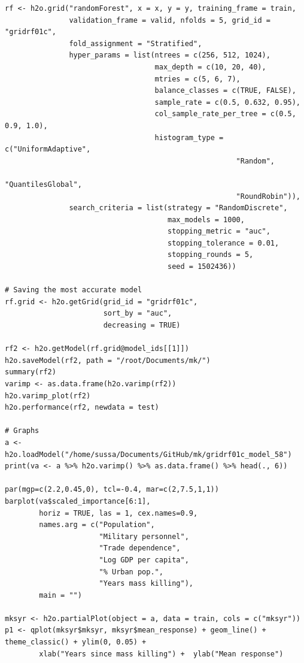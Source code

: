 \documentclass[a4paper,12pt]{article}
\begin{document}
\begin{verbatim}
rf <- h2o.grid("randomForest", x = x, y = y, training_frame = train, 
               validation_frame = valid, nfolds = 5, grid_id = "gridrf01c",
               fold_assignment = "Stratified",
               hyper_params = list(ntrees = c(256, 512, 1024),
                                   max_depth = c(10, 20, 40),
                                   mtries = c(5, 6, 7),
                                   balance_classes = c(TRUE, FALSE),
                                   sample_rate = c(0.5, 0.632, 0.95),
                                   col_sample_rate_per_tree = c(0.5, 0.9, 1.0),
                                   histogram_type = c("UniformAdaptive",
                                                      "Random",
                                                      "QuantilesGlobal",
                                                      "RoundRobin")),
               search_criteria = list(strategy = "RandomDiscrete", 
                                      max_models = 1000, 
                                      stopping_metric = "auc", 
                                      stopping_tolerance = 0.01, 
                                      stopping_rounds = 5, 
                                      seed = 1502436)) 

# Saving the most accurate model
rf.grid <- h2o.getGrid(grid_id = "gridrf01c",
                       sort_by = "auc",
                       decreasing = TRUE)

rf2 <- h2o.getModel(rf.grid@model_ids[[1]])
h2o.saveModel(rf2, path = "/root/Documents/mk/")
summary(rf2)
varimp <- as.data.frame(h2o.varimp(rf2))
h2o.varimp_plot(rf2)
h2o.performance(rf2, newdata = test)

# Graphs
a <- h2o.loadModel("/home/sussa/Documents/GitHub/mk/gridrf01c_model_58")
print(va <- a %>% h2o.varimp() %>% as.data.frame() %>% head(., 6)) 

par(mgp=c(2.2,0.45,0), tcl=-0.4, mar=c(2,7.5,1,1))
barplot(va$scaled_importance[6:1],
        horiz = TRUE, las = 1, cex.names=0.9,
        names.arg = c("Population", 
                      "Military personnel",
                      "Trade dependence", 
                      "Log GDP per capita",
                      "% Urban pop.",
                      "Years mass killing"),
        main = "")

mksyr <- h2o.partialPlot(object = a, data = train, cols = c("mksyr"))
p1 <- qplot(mksyr$mksyr, mksyr$mean_response) + geom_line() + theme_classic() + ylim(0, 0.05) +
        xlab("Years since mass killing") +  ylab("Mean response")
        

\end{verbatim}
\end{document}
